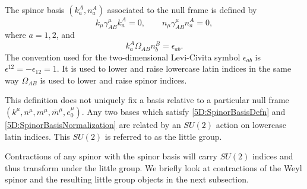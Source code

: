 The spinor basis $(k^{A}_{a}, n^{A}_{a})$ associated to the null frame is defined by
\begin{equation} \label{5D:SpinorBasisDefn} 
        k_{\mu} \gamma^{\mu}_{AB} k^{A}_{a} = 0, \qquad n_{\mu} \gamma^{\mu}_{AB} n^{A}_{a} = 0,
\end{equation}
where $a = 1,2$, and
\begin{equation} \label{5D:SpinorBasisNormalization} 
    k_{a}^{A} \Omega_{AB} n^{B}_{b} = \epsilon_{ab}.
\end{equation}
The convention used for the two-dimensional Levi-Civita symbol $\epsilon_{ab}$ is $\epsilon^{12} = -\epsilon_{12}
= 1$. It is used to lower and raise lowercase latin indices in the same way $\Omega_{AB}$ is used to lower and
raise spinor indices.

This definition does not uniquely fix a basis relative to a particular null frame $(k^{\mu}, n^{\mu}, m^{\mu}, 
\overline{m}^{\mu}, e_{0}^{\mu})$. Any two bases which satisfy \eqref{5D:SpinorBasisDefn} and
\eqref{5D:SpinorBasisNormalization} are related by an $SU(2)$ action on lowercase latin indices.
This $SU(2)$ is referred to as the little group.

Contractions of any spinor with the spinor basis will carry $SU(2)$ indices and
thus transform under the little group. We briefly look at contractions of the Weyl spinor and the resulting little
group objects in the next subsection.
%

